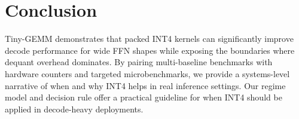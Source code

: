 \section{Conclusion}
Tiny-GEMM demonstrates that packed INT4 kernels can significantly improve
decode performance for wide FFN shapes while exposing the boundaries where
dequant overhead dominates. By pairing multi-baseline benchmarks with hardware
counters and targeted microbenchmarks, we provide a systems-level narrative of
when and why INT4 helps in real inference settings.
Our regime model and decision rule offer a practical guideline for when INT4
should be applied in decode-heavy deployments.